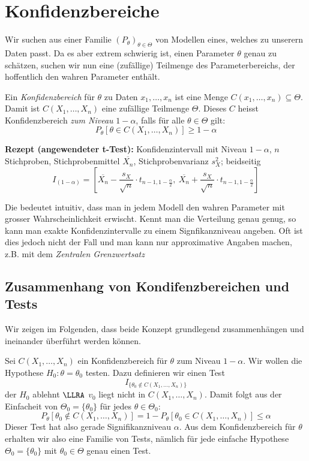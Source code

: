 \section{Konfidenzbereiche}
Wir suchen aus einer Familie $(P_\theta)_{\theta \in \Theta}$ von Modellen eines, welches zu unserern Daten passt. Da es aber extrem schwierig ist, einen Parameter $\theta$ genau zu schätzen, suchen wir nun eine (zufällige) Teilmenge des Parameterbereichs, der hoffentlich den wahren Parameter enthält.

\begin{definition}
Ein \textit{Konfidenzbereich} für $\theta$ zu Daten $x_1, \dots, x_n$ ist eine Menge $C(x_1,\dots, x_n) \subseteq \Theta$. Damit ist $C(X_1,\dots,X_n)$ eine zufällige Teilmenge $\Theta$. Dieses $C$ heisst Konfidenzbereich \textit{zum Niveau} $1-\alpha$, falls für alle $\theta \in \Theta$ gilt:
$$ P_\theta [\theta \in C(X_1,\dots, X_n)] \geq 1-\alpha$$
\end{definition}

\begin{mdframed}
\textbf{Rezept (angewendeter t-Test):} Konfidenzintervall mit Niveau $1-\alpha$, $n$ Stichproben, Stichprobenmittel $\overline{X_n}$, Stichprobenvarianz $s_X^2$; beidseitig
$$
	I_{(1-\alpha)} = [
		\overline{X_n} - \frac{s_X}{\sqrt{n}} \cdot t_{n-1,1-\frac{\alpha}{2}},\ 
		\overline{X_n} + \frac{s_X}{\sqrt{n}} \cdot t_{n-1,1-\frac{\alpha}{2}}
	]
$$
\end{mdframed}

Die bedeutet intuitiv, dass man in jedem Modell den wahren Parameter mit grosser Wahrscheinlichkeit erwischt. Kennt man die Verteilung genau genug, so kann man exakte Konfidenzintervalle zu einem Signfikanzniveau angeben. Oft ist dies jedoch nicht der Fall und man kann nur approximative Angaben machen, z.B. mit dem \textit{Zentralen Grenzwertsatz}

\subsection{Zusammenhang von Kondifenzbereichen und Tests}
Wir zeigen im Folgenden, dass beide Konzept grundlegend zusammenhängen und ineinander überführt werden können.\\

\begin{mdframed}
Sei $C(X_1,\dots,X_n)$ ein Konfidenzbereich für $\theta$ zum Niveau $1-\alpha$. Wir wollen die Hypothese $H_0 : \theta = \theta_0$ testen. Dazu definieren wir einen Test 
$$ I_{\{\theta_0 \notin C(X_1,\dots,X_n)\}}$$
der $H_0$ ablehnt $\LLRA$ $v_0$ liegt nicht in $C(X_1,\dots, X_n)$. Damit folgt aus der Einfacheit von $\Theta_0 = \{\theta_0\}$ für jedes $\theta \in \Theta_0:$
$$ P_{\theta} [\theta_0 \notin C(X_1,\dots,X_n)] = 1 - P_\theta[\theta_0 \in C(X_1,\dots,X_n)] \leq \alpha$$
Dieser Test hat also gerade Signifikanzniveau $\alpha$. Aus dem Konfidenzbereich für $\theta$ erhalten wir also eine Familie von Tests, nämlich für jede einfache Hypothese $\Theta_0 = \{\theta_0\}$ mit $\theta_0 \in \Theta$ genau einen Test.\\

\end{mdframed}